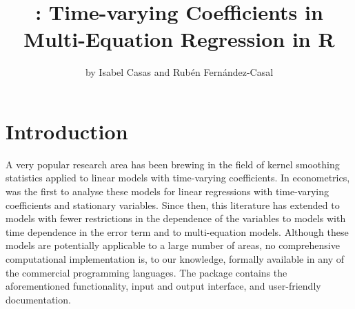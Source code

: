 
\title{: Time-varying Coefficients in Multi-Equation Regression in R}
\author{by Isabel Casas and Rub\'{e}n Fern\'andez-Casal}
\maketitle
{}


\section{Introduction}

A very popular research area has been brewing in the field of kernel smoothing statistics applied to linear models with time-varying coefficients. In econometrics, \citet{Robinson1989} was the first to analyse these models for linear regressions with time-varying coefficients and stationary variables. Since then, this literature has extended to models with fewer restrictions in the dependence of the variables to models with time dependence in the error term and to multi-equation models. Although these models are potentially applicable to a large number of areas, no comprehensive computational implementation is, to our knowledge, formally available in any of the commercial programming languages. The package  contains the aforementioned functionality, input and output interface, and user-friendly documentation.

